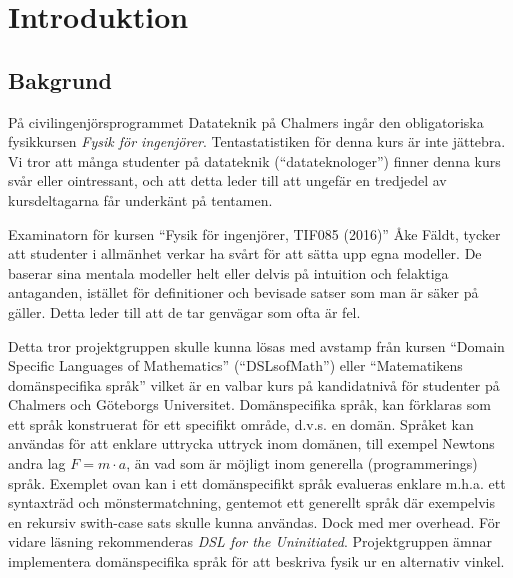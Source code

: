 
\chapter{Introduktion}

\section{Bakgrund}

\begin{draft}

På civilingenjörsprogrammet Datateknik på Chalmers ingår den obligatoriska fysikkursen
\textit{Fysik för ingenjörer}. Tentastatistiken för denna kurs är
inte jättebra\cite{tentastatistik}. Vi
tror att många studenter på datateknik (``datateknologer'') finner denna kurs
svår eller ointressant, och att detta leder till att ungefär en
tredjedel av kursdeltagarna får underkänt på tentamen.

Examinatorn för kursen ``Fysik för ingenjörer, TIF085 (2016)'' Åke Fäldt, tycker
att studenter i allmänhet verkar ha svårt för att sätta upp egna
modeller. De baserar sina mentala modeller helt eller delvis på
intuition och felaktiga antaganden, istället för definitioner och
bevisade satser som man är säker på gäller. Detta leder till att de
tar genvägar som ofta är fel.

Detta tror projektgruppen skulle kunna lösas med avstamp från kursen ``Domain Specific Languages of
Mathematics'' (``DSLsofMath'') eller ``Matematikens domänspecifika språk''
vilket är en valbar kurs på kandidatnivå för studenter på Chalmers och
Göteborgs Universitet. Domänspecifika språk, kan
förklaras som ett språk konstruerat för ett specifikt område, d.v.s. en
domän. Språket kan användas för att enklare uttrycka uttryck inom
domänen, till exempel Newtons andra lag $F=m \cdot a$, än vad som är
möjligt inom generella (programmerings) språk. Exemplet ovan kan i ett 
domänspecifikt språk evalueras enklare m.h.a. ett syntaxträd och mönstermatchning,
gentemot ett generellt språk där exempelvis en rekursiv swith-case sats skulle kunna användas. 
Dock med mer overhead. För vidare läsning
rekommenderas \textit{DSL for the Uninitiated}.\cite{DSLU} Projektgruppen ämnar implementera 
domänspecifika språk för att beskriva fysik ur en alternativ vinkel.


\end{draft}
